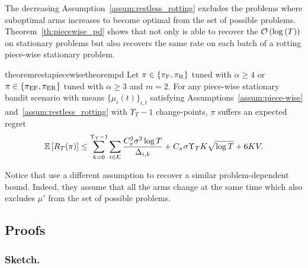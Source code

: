 The decreasing Assumption~\ref{assum:restless_rotting} excludes the problems where suboptimal arms increases to become optimal from the set of possible problems. Theorem~\ref{th:piecewise_pd} shows that not only \RAWUCB is able to recover the $\mathcal{O}\left(\log\left(T\right)\right)$ on stationary problems but also recovers the same rate on each batch of a rotting piece-wise stationary problem. 
\begin{restatable}{theorem}{restapiecewisetheorempd}
\label{th:piecewise_pd}
Let $\pi \in \left\{ \pi_{\rm F}, \pi_{\rm R}\right\}$ tuned with $\alpha \geq 4$ or $\pi \in \left\{ \normalfont \pi_{\rm EF}, \normalfont \pi_{\rm ER}\right\}$ tuned with $\alpha \geq 3$ and $m=2$. For any piece-wise stationary bandit scenario with means $\{\mu_i(t)\}_{i,t}$ satisfying Assumptions~\ref{assum:piece-wise} and~\ref{assum:restless_rotting}  with $\Upsilon_T-1$ change-points, $\pi$ suffers an expected regret\,
\[
    \mathbb{E}\left[R_T(\pi)\right] \leq \sum_{k=0}^{\Upsilon_T-1} \sum_{i\in\mathcal{K}} \frac{C_\pi^2 \sigma^2\log{T}}{\Delta_{i,k}} +  C_\pi \sigma \Upsilon_T K \sqrt{ \log{T}} + 6KV. 
\]
\end{restatable}

Notice that \citet{mukherjee2019distribution} use a different assumption to recover a similar problem-dependent bound. Indeed, they assume that all the arms change at the same time which also excludes $\mu'$ from the set of possible problems. %

\subsection{Proofs}
\label{ss:restless-proof}

\subsubsection*{Sketch.} 

